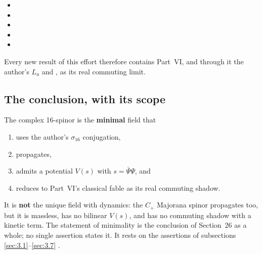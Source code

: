 \begin{itemize}
  \item {}
  \item {}
  \item {}
  \item {}
  \item {}
\end{itemize}
Every new result of this effort therefore contains Part~VI, and through it the author's $L_a$ and
, as its real commuting limit.

\subsection{The conclusion, with its scope}
\label{sec:3.8}

The complex 16-spinor is the \textbf{minimal} field that
\begin{enumerate}
  \item uses the author's $\sigma_{16}$ conjugation,
  \item propagates,
  \item admits a potential $V(s)$ with $s=\bar\Psi\Psi$, and
  \item reduces to Part~VI's classical fable as its real commuting shadow.
\end{enumerate}
It is \textbf{not} the unique field with dynamics: the $C_+$ Majorana spinor propagates too, but it
is massless, has no bilinear $V(s)$, and has no commuting shadow with a kinetic term. The statement
of minimality is the conclusion of Section~26 as a whole; no single assertion states it. It rests
on the assertions of subsections \ref{sec:3.1}--\ref{sec:3.7} .

